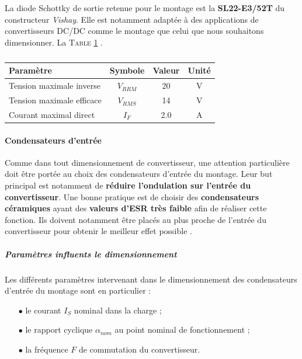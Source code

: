 \documentclass[a4paper,12pt]{report}
\begin{document}
					La diode Schottky de sortie retenue pour le montage est la \textbf{SL22-E3/52T} du constructeur \textit{Vishay}. Elle est notamment adaptée à des applications de convertisseurs DC/DC comme le montage que celui que nous souhaitons dimensionner. La \textsc{Table \ref{charact_schottky}} \cite{SL22}.
					
					\begin{table}
						\begin{center}
							\begin{tabular}{|l|c|c|c}
							\hline
							Paramètre & Symbole & Valeur & Unité \\
							\hline						
							Tension maximale inverse & $V_{RRM}$ & 20 & V \\
							\hline						
							Tension maximale efficace & $V_{RMS}$ & 14 & V \\
							\hline						
							Courant maximal direct & $I_{F}$ & 2.0 & A \\
							\hline						
							\end{tabular}					
						\end{center}
						\caption{}
						\label{charact_schottky}
					\end{table}
				
					\paragraph{Condensateurs d'entrée}
					
					Comme dans tout dimensionnement de convertisseur, une attention particulière doit être portée au choix des condensateurs d'entrée du montage. Leur but principal est notamment de \textbf{réduire l'ondulation sur l'entrée du convertisseur}. Une bonne pratique est de choisir des \textbf{condensateurs céramiques} ayant des \textbf{valeurs d'ESR très faible} afin de réaliser cette fonction. Ils doivent notamment être placés au plus proche de l'entrée du convertisseur pour obtenir le meilleur effet possible \cite{A055}.
								
						\subparagraph{Paramètres influents le dimensionnement}
						Les différents paramètres intervenant dans le dimensionnement des condensateurs d'entrée du montage sont en particulier :
						
						\begin{itemize}
							\item[$\bullet$] le courant $I_{S}$ nominal dans la charge ;
							\item[$\bullet$] le rapport cyclique  $\alpha_{nom}$ au point nominal de fonctionnement ;
							\item[$\bullet$] la fréquence $F$ de commutation du convertisseur.	
						\end{itemize}
						
\end{document}
